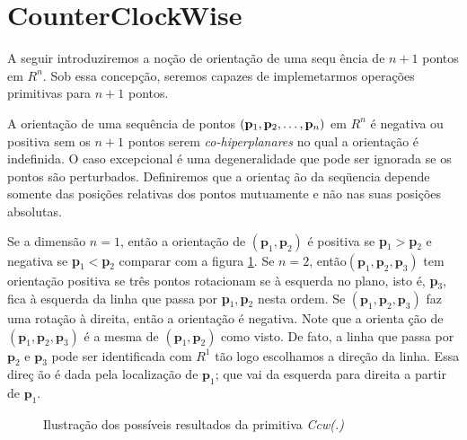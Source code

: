 \documentclass[12pt,a4paper]{book}
\begin{document}
\section[Teste de Orienta\c{c}\~{a}o]{CounterClockWise}

A seguir introduziremos a no\c{c}\~{a}o de orienta\c{c}\~{a}o de uma sequ%
\^{e}ncia de $n+1$ pontos em $R^{n}$. Sob essa concep\c{c}\~{a}o, seremos
capazes de implemetarmos opera\c{c}\~{o}es primitivas para $n+1$ pontos.

A orienta\c{c}\~{a}o de uma sequ\^{e}ncia de pontos $(\mathbf{p}_{1},\mathbf{%
p}_{2},\ldots ,\mathbf{p}_{n})$ em $R^{n}$ \'{e} negativa ou positiva sem os 
$n+1$ pontos serem \textit{co-hiperplanares }no qual a orienta\c{c}\~{a}o 
\'{e} indefinida. O caso excepcional \'{e} uma degeneralidade que pode ser
ignorada se os pontos s\~{a}o perturbados. Definiremos que a orienta\c{c}%
\~{a}o da seq\"{u}encia depende somente das posi\c{c}\~{o}es relativas dos
pontos mutuamente e n\~{a}o nas suas posi\c{c}\~{o}es absolutas.

Se a dimens\~{a}o $n=1$, ent\~{a}o a orienta\c{c}\~{a}o de $(\mathbf{p}_{1},%
\mathbf{p}_{2})$ \'{e} positiva se \textbf{p}$_{1}>$\textbf{p}$_{2}$ e
negativa se \textbf{p}$_{1}<$\textbf{p}$_{2}$ comparar com a figura \ref{fig1_chapter2}. 
Se $n=2$, ent\~{a}o$(\mathbf{p}_{1},\mathbf{p}_{2},\mathbf{p}_{3})$
tem orienta\c{c}\~{a}o positiva se tr\^{e}s pontos rotacionam se \`{a}
esquerda no plano, isto \'{e}, \textbf{p}$_{3}$, fica \`{a} esquerda da
linha que passa por \textbf{p}$_{1},$\textbf{p}$_{2}$ nesta ordem. Se $(%
\mathbf{p}_{1},\mathbf{p}_{2},\mathbf{p}_{3})$ faz uma rota\c{c}\~{a}o \`{a}
direita, ent\~{a}o a orienta\c{c}\~{a}o \'{e} negativa. Note que a orienta%
\c{c}\~{a}o de $(\mathbf{p}_{1},\mathbf{p}_{2},\mathbf{p}_{3})$ \'{e} a
mesma de $(\mathbf{p}_{1},\mathbf{p}_{2})$ como visto. De fato, a linha que
passa por $\mathbf{p}_{2}$ e $\mathbf{p}_{3}$ pode ser identificada com $%
R^{1}$ t\~{a}o logo escolhamos a dire\c{c}\~{a}o da linha. Essa dire\c{c}%
\~{a}o \'{e} dada pela localiza\c{c}\~{a}o de $\mathbf{p}_{1}$; que vai da
esquerda para direita a partir de $\mathbf{p}_{1}.$

\begin{figure}[htbp]
  \begin{center}
    \leavevmode
    
    \caption{Ilustra\c{c}\~{a}o dos poss\'{i}veis resultados da primitiva \textit{Ccw(.)} }
    \label{fig1_chapter2}
  \end{center}
\end{figure}
\end{document}
